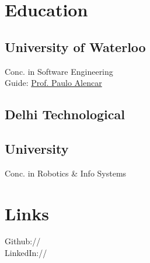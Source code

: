 \documentclass[]{Vishnu-Resume}
\begin{document}
\lastupdated


%
%

\begin{minipage}[t]{0.33\textwidth} 


\section{Education} 

\subsection{University of Waterloo}
Conc. in Software Engineering \\
Guide: \href{https://cs.uwaterloo.ca/about/people/palencar}{Prof. Paulo Alencar}\\
\sectionsep

\subsection{Delhi Technological}
\subsection{University}
Conc. in Robotics \& Info Systems \\
\sectionsep


\section{Links} 
Github:// \href{https://github.com/zxingz}{} \\
LinkedIn://  \href{https://www.linkedin.com/in/zxingz/}{} \\
\sectionsep



\end{minipage}
\end{document}
